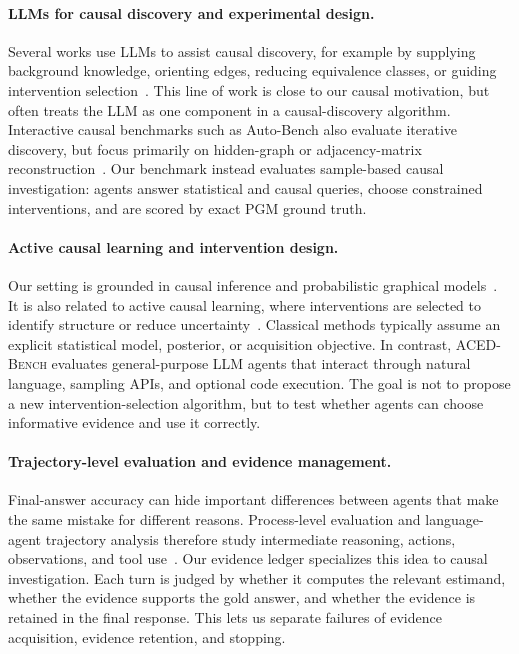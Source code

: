 \documentclass{article}
\newcommand{\bench}{\textsc{ACED-Bench} }
\begin{document}
\paragraph{LLMs for causal discovery and experimental design.}
Several works use LLMs to assist causal discovery, for example by supplying background knowledge, orienting edges, reducing equivalence classes, or guiding intervention selection~\citep{longCausalDiscoveryLanguage2023,takayamaIntegratingLargeLanguage2025,abdulaalCausalModellingAgents2024,liCanLargeLanguage2025}.
This line of work is close to our causal motivation, but often treats the LLM as one component in a causal-discovery algorithm.
Interactive causal benchmarks such as Auto-Bench also evaluate iterative discovery, but focus primarily on hidden-graph or adjacency-matrix reconstruction~\citep{chenAutoBenchAutomatedBenchmark2025}.
Our benchmark instead evaluates sample-based causal investigation: agents answer statistical and causal queries, choose constrained interventions, and are scored by exact PGM ground truth.

\paragraph{Active causal learning and intervention design.}
Our setting is grounded in causal inference and probabilistic graphical models~\citep{pearl2009causality,koller2009probabilistic}.
It is also related to active causal learning, where interventions are selected to identify structure or reduce uncertainty~\citep{he2008active,hauserCharacterizationGreedyLearning2012,tothActiveBayesianCausal2022,zhangActiveLearningOptimal2023}.
Classical methods typically assume an explicit statistical model, posterior, or acquisition objective.
In contrast, \bench evaluates general-purpose LLM agents that interact through natural language, sampling APIs, and optional code execution.
The goal is not to propose a new intervention-selection algorithm, but to test whether agents can choose informative evidence and use it correctly.

\paragraph{Trajectory-level evaluation and evidence management.}
Final-answer accuracy can hide important differences between agents that make the same mistake for different reasons.
Process-level evaluation and language-agent trajectory analysis therefore study intermediate reasoning, actions, observations, and tool use~\citep{lightmanLetsVerifyStep2023,yaoReActSynergizingReasoning2023b,shinnReflexionLanguageAgents2023,kimFinalAnswerEvaluating2025,fanAgentProcessBenchDiagnosingStepLevel2026}.
Our evidence ledger specializes this idea to causal investigation.
Each turn is judged by whether it computes the relevant estimand, whether the evidence supports the gold answer, and whether the evidence is retained in the final response.
This lets us separate failures of evidence acquisition, evidence retention, and stopping.
\end{document}
